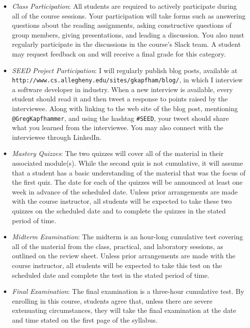\documentclass[11pt]{article}
\newcommand{\url}[1]{\lstinline{#1}}
\begin{document}
\begin{itemize}

  \item {\em Class Participation\/}: All students are required to actively participate during all of the course
    sessions. Your participation will take forms such as answering questions about the reading assignments, asking
    constructive questions of group members, giving presentations, and leading a discussion. You also must regularly
    participate in the discussions in the course's Slack team. A student may request feedback on and will receive a
    final grade for this category.

  \item {\em SEED Project Participation\/}: I will regularly publish blog posts, available at
    \url{http://www.cs.allegheny.edu/sites/gkapfham/blog/}, in which I interview a software developer in industry. When
    a new interview is available, every student should read it and then tweet a response to points raised by the
    interviewee. Along with linking to the web site of the blog post, mentioning \url{@GregKapfhammer}, and using the
    hashtag \url{#SEED}, your tweet should share what you learned from the interviewee. You may also connect with the
    interviewee through LinkedIn.

  \item {\em Mastery Quizzes\/}: The two quizzes will cover all of the material in their associated module(s). While the
    second quiz is not cumulative, it will assume that a student has a basic understanding of the material that was the
    focus of the first quiz. The date for each of the quizzes will be announced at least one week in advance of the
    scheduled date. Unless prior arrangements are made with the course instructor, all students will be expected to take
    these two quizzes on the scheduled date and to complete the quizzes in the stated period of time.

  \item {\em Midterm Examination\/}: The midterm is an hour-long cumulative test covering all of the material from the
    class, practical, and laboratory sessions, as outlined on the review sheet. Unless prior arrangements are made with
    the course instructor, all students will be expected to take this test on the scheduled date and complete the test
    in the stated period of time.

  \item {\em Final Examination\/}: The final examination is a three-hour cumulative test. By enrolling in this course,
    students agree that, unless there are severe extenuating circumstances, they will take the final examination at the
    date and time stated on the first page of the syllabus.


\end{itemize}
\end{document}
